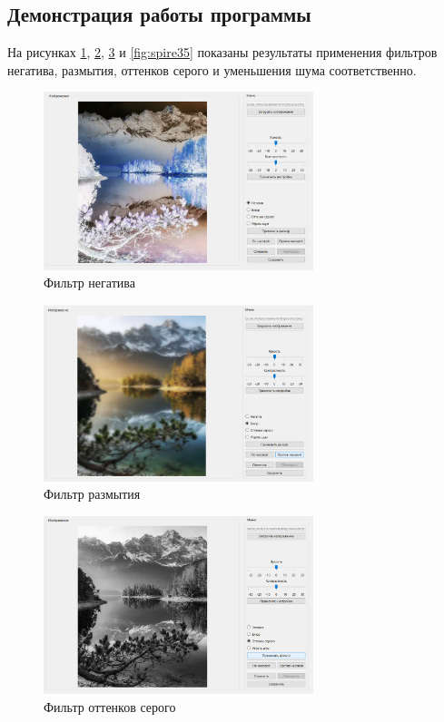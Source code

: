 \subsection{Демонстрация работы программы}

На рисунках \ref{fig:spire32}, \ref{fig:spire33}, \ref{fig:spire34} и \ref{fig:spire35} показаны результаты применения фильтров негатива, размытия, оттенков серого и уменьшения шума соответственно.

\begin{figure}[hbtp]
	\centering
	\includegraphics[width=0.7\textwidth]{img/res2.png}
	\caption{\label{fig:spire32} Фильтр негатива}
\end{figure}

\begin{figure}[hbtp]
	\centering
	\includegraphics[width=0.7\textwidth]{img/res5.png}
	\caption{\label{fig:spire33} Фильтр размытия}
\end{figure}

\begin{figure}[hbtp]
	\centering
	\includegraphics[width=0.7\textwidth]{img/res6.png}
	\caption{\label{fig:spire34} Фильтр оттенков серого}
\end{figure}

